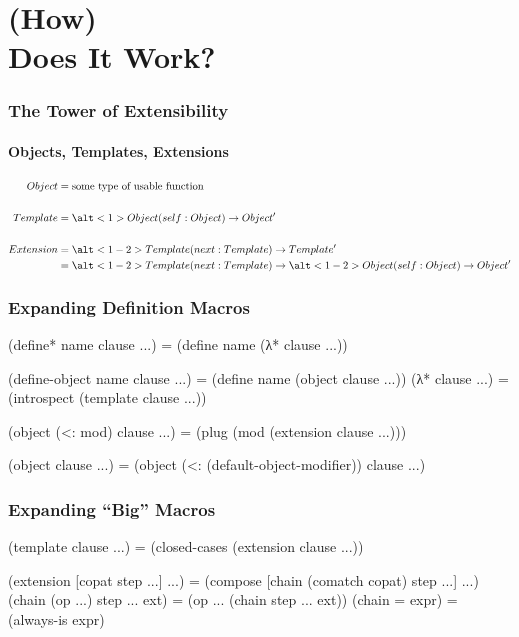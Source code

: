 \documentclass{beamer}
\begin{document}
\section{(How) \\ Does It Work?}

\begin{frame}
\frametitle{The Tower of Extensibility}
\framesubtitle{Objects, Templates, Extensions}

\begin{align*}
  Object
  &=
  \text{some type of usable function}
  \\\\
  Template
  &=
  \alt<1>{Object}{(self : Object)} \to Object'
  \\\\
  Extension
  &=
  \alt<1-2>{Template}{(next : Template)} \to Template'
  \\
  &=
  \alt<1-2>{Template}{(next : Template)}
  \to \alt<1-2>{Object}{(self : Object)}
  \to Object'
\end{align*}

\pause\pause
\end{frame}

\let\mintscheme\scheme
\let\mintendscheme\endscheme
\let\scheme\relax
\let\endscheme\relax
{}

\begin{frame}[fragile]
\frametitle{Expanding Definition Macros}

\begin{scheme}
(define* name clause ...)
= (define name (λ* clause ...))

(define-object name clause ...)
= (define name (object clause ...))
\end{scheme}
\pause
\begin{scheme}
(λ* clause ...) = (introspect (template clause ...))

(object (<: mod) clause ...)
= (plug (mod (extension clause ...)))

(object clause ...)
= (object (<: (default-object-modifier)) clause ...)
\end{scheme}
\end{frame}

\begin{frame}[fragile]
\frametitle{Expanding ``Big'' Macros}

\begin{scheme}
(template clause ...)
= (closed-cases (extension clause ...))

(extension [copat step ...] ...)
= (compose [chain (comatch copat) step ...] ...)
\end{scheme}
\pause
\begin{scheme}
(chain (op ...) step ... ext)
= (op ... (chain step ... ext))
(chain = expr)
= (always-is expr)
\end{scheme}
\end{frame}
\end{document}
